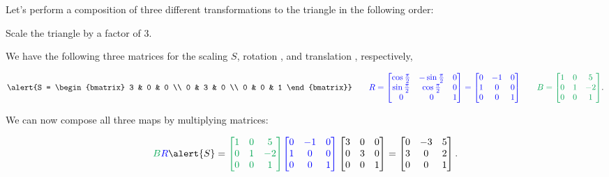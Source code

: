 \documentclass[xcolor=dvipsnames,aspectratio=169,t]{beamer}
\begin{document}
\begin{frame}
  Let's perform a composition of three different transformations to the triangle in the following order:

  \bb
  \ii \alert{Scale the triangle by a factor of 3.}
  \ii {}
  \ii {}
  \ee

  We have the following three matrices for the scaling \alert{$S$}, rotation , and translation , respectively,

\[ \alert{S = \begin{bmatrix} 3 & 0 & 0 \\ 0 & 3 & 0 \\ 0 & 0 & 1 \end{bmatrix}} \qquad
\colorb{R = \begin{bmatrix} \cos{\frac{\pi}{2}} & -\sin{\frac{\pi}{2}}& 0 \\ \sin{\frac{\pi}{2}} & \cos{\frac{\pi}{2}} & 0 \\ 0 & 0 & 1 \end{bmatrix} = \begin{bmatrix} 0 & -1 & 0 \\ 1 & 0 & 0 \\ 0 & 0 & 1 \end{bmatrix}} \qquad
\colorg{B = \begin{bmatrix} 1 & 0 & 5 \\ 0 & 1 & -2 \\ 0 & 0 & 1 \end{bmatrix}}.\]

  We can now compose all three maps by multiplying matrices:

\[\colorg{B}\colorb{R}\alert{S} =  \colorg{\begin{bmatrix} 1 & 0 & 5 \\ 0 & 1 & -2 \\ 0 & 0 & 1 \end{bmatrix}}
\colorb{\begin{bmatrix} 0 & -1 & 0 \\ 1 & 0 & 0 \\ 0 & 0 & 1 \end{bmatrix}}
\begin{bmatrix} 3 & 0 & 0 \\ 0 & 3 & 0 \\ 0 & 0 & 1 \end{bmatrix} = \begin{bmatrix} 0 & -3 & 5\\
3 & 0 & 2 \\ 0 & 0 & 1 \end{bmatrix}.\]
\end{frame}
\end{document}
